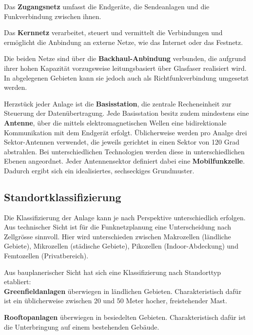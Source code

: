 Das \textbf{Zugangsnetz} umfasst die Endgeräte, die Sendeanlagen und die Funkverbindung zwischen ihnen. 

Das \textbf{Kernnetz} verarbeitet, steuert und vermittelt die Verbindungen und ermöglicht die Anbindung an externe Netze, wie das Internet oder das Festnetz. \cite{behnkeGrundkursMobilfunkUnd2022}

Die beiden Netze sind über die \textbf{Backhaul-Anbindung} verbunden, die aufgrund ihrer hohen Kapazität vorzugsweise leitungsbasiert über Glasfaser realisiert wird. In abgelegenen Gebieten kann sie jedoch auch als Richtfunkverbindung umgesetzt werden.

Herzstück jeder Anlage ist die \textbf{Basisstation}, die zentrale Recheneinheit zur Steuerung der Datenübertragung.  Jede Basisstation besitz zudem mindestens eine \textbf{Antenne}, über die mittels elektromagnetischen Wellen eine bidirektionale Kommunikation mit dem Endgerät erfolgt. Üblicherweise werden pro Analge drei Sektor-Antennen verwendet, die jeweils gerichtet in einen Sektor von 120 Grad abstrahlen. Bei unterschiedlichen Technologien werden diese in unterschiedlichen Ebenen angeordnet. Jeder Antennensektor definiert dabei eine \textbf{Mobilfunkzelle}. Dadurch ergibt sich ein idealisiertes, sechseckiges Grundmuster. \cite{behnkeGrundkursMobilfunkUnd2022}

\subsection{Standortklassifizierung}
Die Klassifizierung der Anlage kann je nach Perspektive unterschiedlich erfolgen. Aus technischer Sicht ist für die Funknetzplanung eine Unterscheidung nach Zellgrösse sinnvoll. Hier wird unterschieden zwischen Makrozellen (ländliche Gebiete), Mikrozellen (städische Gebiete), Pikozellen (Indoor-Abdeckung) und Femtozellen (Privatbereich). \cite{bundesratNachhaltigesMobilfunknetzBericht2022}

Aus bauplanerischer Sicht hat sich eine Klassifizierung nach Standorttyp etabliert: \\

\textbf{Greenfieldanlagen} überwiegen in ländlichen Gebieten. Charakteristisch dafür ist ein üblicherweise zwischen 20 und 50 Meter hocher, freistehender Mast.

\textbf{Rooftopanlagen} überwiegen in besiedelten Gebieten. Charakteristisch dafür ist die Unterbringung auf einem bestehenden Gebäude. 

